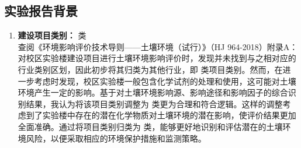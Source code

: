 \subsection{实验报告背景}
\begin{enumerate}
    \item \textbf{建设项目类别：}\uppercase\expandafter{} 类 \\
    查阅《环境影响评价技术导则——土壤环境（试行）》（HJ 964-2018）附录A：对校区实验楼建设项目进行土壤环境影响评价时，发现并未找到与之相对应的行业类别区划，因此初步将其归类为其他行业，即 \uppercase\expandafter{} 类项目类别。然而，在进一步考虑时发现，校区实验楼一般包含化学试剂的处理和使用，这可能对土壤环境产生一定的影响。基于对土壤环境影响源、影响途径和影响因子的综合识别结果，我认为将该项目类别调整为 \uppercase\expandafter{} 类更为合理和符合逻辑。这样的调整考虑到了实验楼中存在的潜在化学物质对土壤环境的潜在影响，使评价结果更加全面准确。通过将项目类别归类为 \uppercase\expandafter{} 类，能够更好地识别和评估潜在的土壤环境风险，以便采取相应的环境保护措施和监测策略。


\end{enumerate}
